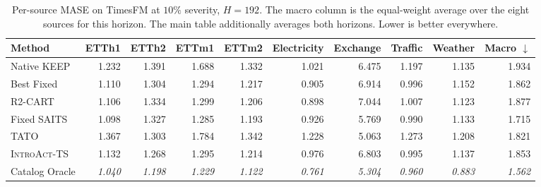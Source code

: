 \documentclass{article}
\newcommand{\oracle}[1]{\textit{\textcolor{phgray}{#1}}}
\newcommand{\introact}{\textsc{IntroAct-TS}}
\begin{document}
\begin{table}[!t]
  \caption{Per-source MASE on TimesFM at $10\%$ severity, $H=192$. The macro column is the
  equal-weight average over the eight sources for this horizon. The main table additionally averages both horizons. Lower is better everywhere.}
  \label{tab:app-src-tf-192}
  \centering
  \small
  \setlength{\tabcolsep}{3pt}
\begin{tabular*}{\textwidth}{@{\extracolsep{\fill}}lrrrrrrrrr@{}}
    \toprule
    Method & ETTh1 & ETTh2 & ETTm1 & ETTm2 & Electricity & Exchange & Traffic & Weather & Macro $\downarrow$ \\
    \midrule
    Native KEEP & 1.232 & 1.391 & 1.688 & 1.332 & 1.021 & 6.475 & 1.197 & 1.135 & 1.934 \\
    Best Fixed & 1.110 & 1.304 & 1.294 & 1.217 & 0.905 & 6.914 & 0.996 & 1.152 & 1.862 \\
    R2-CART & 1.106 & 1.334 & 1.299 & 1.206 & 0.898 & 7.044 & 1.007 & 1.123 & 1.877 \\
    Fixed SAITS & 1.098 & 1.327 & 1.285 & 1.193 & 0.926 & 5.769 & 0.990 & 1.133 & 1.715 \\
    TATO & 1.367 & 1.303 & 1.784 & 1.342 & 1.228 & 5.063 & 1.273 & 1.208 & 1.821 \\
    \midrule
    \rowcolor{bestgray}\introact{} & 1.132 & 1.268 & 1.295 & 1.214 & 0.976 & 6.803 & 0.995 & 1.137 & 1.853 \\
    \midrule
    Catalog Oracle & \oracle{1.040} & \oracle{1.198} & \oracle{1.229} & \oracle{1.122} & \oracle{0.761} & \oracle{5.304} & \oracle{0.960} & \oracle{0.883} & \oracle{1.562} \\
    \bottomrule
  \end{tabular*}
\end{table}
\end{document}
